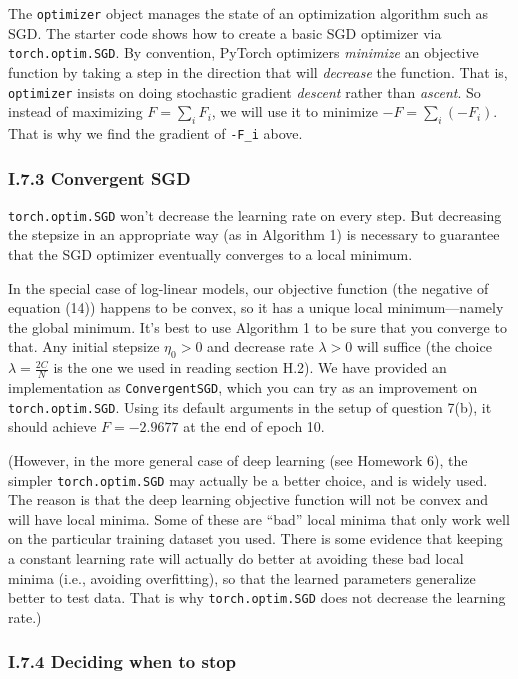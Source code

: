 The \texttt{optimizer} object manages the state of an optimization algorithm such as SGD. The starter code shows how to create a basic SGD optimizer via \texttt{torch.optim.SGD}. By convention, PyTorch optimizers \emph{minimize} an objective function by taking a step in the direction that will \emph{decrease} the function. That is, \texttt{optimizer} insists on doing stochastic gradient \emph{descent} rather than \emph{ascent}. So instead of maximizing $F = \sum_i F_i$, we will use it to minimize $-F = \sum_i (-F_i)$. That is why we find the gradient of \texttt{-F\_i} above.

\subsubsection*{I.7.3 Convergent SGD}

\texttt{torch.optim.SGD} won’t decrease the learning rate on every step. But decreasing the stepsize in an appropriate way (as in Algorithm 1) is necessary to guarantee that the SGD optimizer eventually converges to a local minimum.

In the special case of log-linear models, our objective function (the negative of equation (14)) happens to be convex, so it has a unique local minimum—namely the global minimum. It’s best to use Algorithm 1 to be sure that you converge to that. Any initial stepsize $\eta_0 > 0$ and decrease rate $\lambda > 0$ will suffice (the choice $\lambda = \tfrac{2C}{N}$ is the one we used in reading section H.2). We have provided an implementation as \texttt{ConvergentSGD}, which you can try as an improvement on \texttt{torch.optim.SGD}. Using its default arguments in the setup of question 7(b), it should achieve $F = -2.9677$ at the end of epoch 10.

(However, in the more general case of deep learning (see Homework 6), the simpler \texttt{torch.optim.SGD} may actually be a better choice, and is widely used. The reason is that the deep learning objective function will not be convex and will have local minima. Some of these are “bad” local minima that only work well on the particular training dataset you used. There is some evidence that keeping a constant learning rate will actually do better at avoiding these bad local minima (i.e., avoiding overfitting), so that the learned parameters generalize better to test data. That is why \texttt{torch.optim.SGD} does not decrease the learning rate.)

\subsubsection*{I.7.4 Deciding when to stop}

